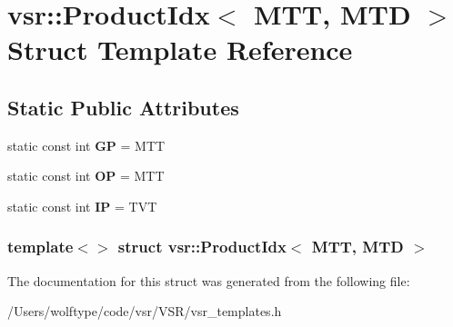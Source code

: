 \hypertarget{structvsr_1_1_product_idx_3_01_m_t_t_00_01_m_t_d_01_4}{\section{vsr\-:\-:Product\-Idx$<$ M\-T\-T, M\-T\-D $>$ Struct Template Reference}
\label{structvsr_1_1_product_idx_3_01_m_t_t_00_01_m_t_d_01_4}
}
\subsection*{Static Public Attributes}
\begin{DoxyCompactItemize}
\item 
\hypertarget{structvsr_1_1_product_idx_3_01_m_t_t_00_01_m_t_d_01_4_a67cb5a4b52976d88d7c358e2dbb09146}{static const int {\bfseries G\-P} = M\-T\-T}\label{structvsr_1_1_product_idx_3_01_m_t_t_00_01_m_t_d_01_4_a67cb5a4b52976d88d7c358e2dbb09146}

\item 
\hypertarget{structvsr_1_1_product_idx_3_01_m_t_t_00_01_m_t_d_01_4_a80bd5dc1f9c07c16c81e3526076ee5b9}{static const int {\bfseries O\-P} = M\-T\-T}\label{structvsr_1_1_product_idx_3_01_m_t_t_00_01_m_t_d_01_4_a80bd5dc1f9c07c16c81e3526076ee5b9}

\item 
\hypertarget{structvsr_1_1_product_idx_3_01_m_t_t_00_01_m_t_d_01_4_a39810866ed697317d0e6bae055d6e35a}{static const int {\bfseries I\-P} = T\-V\-T}\label{structvsr_1_1_product_idx_3_01_m_t_t_00_01_m_t_d_01_4_a39810866ed697317d0e6bae055d6e35a}

\end{DoxyCompactItemize}
\subsubsection*{template$<$$>$ struct vsr\-::\-Product\-Idx$<$ M\-T\-T, M\-T\-D $>$}



The documentation for this struct was generated from the following file\-:\begin{DoxyCompactItemize}
\item 
/\-Users/wolftype/code/vsr/\-V\-S\-R/vsr\-\_\-templates.\-h\end{DoxyCompactItemize}
